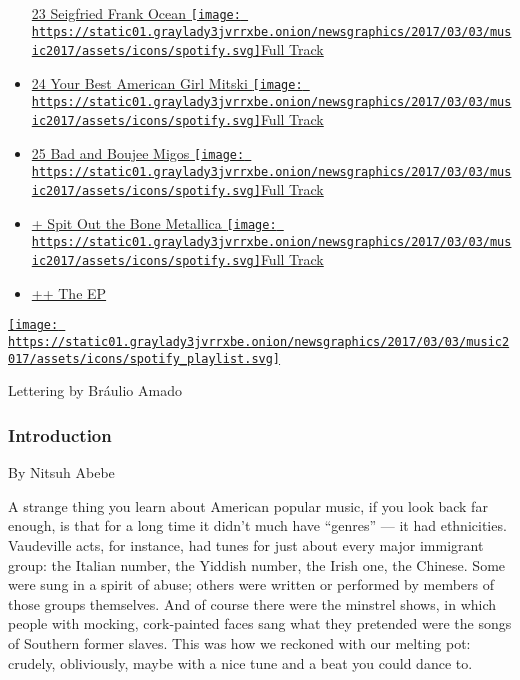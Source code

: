 \begin{itemize}
  \protect\hyperlink{ux2ffrank-ocean-seigfried}{ 23 Seigfried Frank
  Ocean }
  \href{https://open.spotify.com/track/1BViPjTT585XAhkUUrkts0}{\texttt{[image: https://static01.graylady3jvrrxbe.onion/newsgraphics/2017/03/03/music2017/assets/icons/spotify.svg]}Full
  Track}
\item
  \protect\hyperlink{ux2fmitski-your-best-american-girl}{ 24 Your Best
  American Girl Mitski }
  \href{https://open.spotify.com/track/172rW45GEnGoJUuWfm1drt}{\texttt{[image: https://static01.graylady3jvrrxbe.onion/newsgraphics/2017/03/03/music2017/assets/icons/spotify.svg]}Full
  Track}
\item
  \protect\hyperlink{ux2fmigos-bad-and-boujee}{ 25 Bad and Boujee Migos
  }
  \href{https://open.spotify.com/track/4Km5HrUvYTaSUfiSGPJeQR}{\texttt{[image: https://static01.graylady3jvrrxbe.onion/newsgraphics/2017/03/03/music2017/assets/icons/spotify.svg]}Full
  Track}
\item
  \protect\hyperlink{ux2fmetallica-spit-out-the-bone}{ + Spit Out the
  Bone Metallica }
  \href{https://open.spotify.com/track/7MHkweinOceprzkRWIYTTc}{\texttt{[image: https://static01.graylady3jvrrxbe.onion/newsgraphics/2017/03/03/music2017/assets/icons/spotify.svg]}Full
  Track}
\item
  \protect\hyperlink{ux2fthe-ep-the-music-issue-podcast}{ ++ The EP }
\end{itemize}

\href{https://open.spotify.com/user/nytmag/playlist/4FrPqvd2eD17G3slCaIAYG}{\texttt{[image: https://static01.graylady3jvrrxbe.onion/newsgraphics/2017/03/03/music2017/assets/icons/spotify\_playlist.svg]}}

Lettering by Bráulio Amado

\hypertarget{introduction}{%
\subsubsection{Introduction}\label{introduction}}

By Nitsuh Abebe

A strange thing you learn about American popular music, if you look back
far enough, is that for a long time it didn't much have ``genres'' ---
it had ethnicities. Vaudeville acts, for instance, had tunes for just
about every major immigrant group: the Italian number, the Yiddish
number, the Irish one, the Chinese. Some were sung in a spirit of abuse;
others were written or performed by members of those groups themselves.
And of course there were the minstrel shows, in which people with
mocking, cork-painted faces sang what they pretended were the songs of
Southern former slaves. This was how we reckoned with our melting pot:
crudely, obliviously, maybe with a nice tune and a beat you could dance
to.

